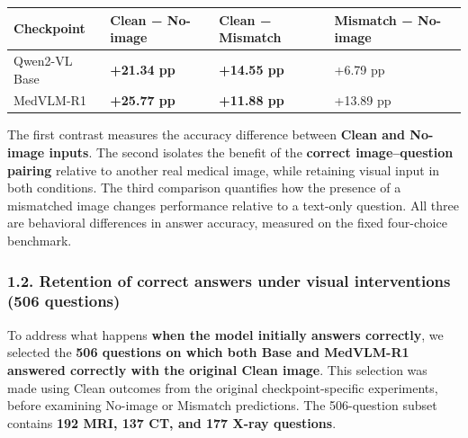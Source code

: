 \documentclass[
  10pt,
  a4paper,
]{article}
\newcounter{none} %
\begin{document}
{\def\LTcaptype{none} %
\begin{longtable}[]{@{}
  >{\raggedright\arraybackslash}p{}
  >{\raggedleft\arraybackslash}p{}
  >{\raggedleft\arraybackslash}p{}
  >{\raggedleft\arraybackslash}p{}@{}}
\toprule\noalign{}
\begin{minipage}[b]{\linewidth}\raggedright
Checkpoint
\end{minipage} & \begin{minipage}[b]{\linewidth}\raggedleft
Clean − No-image
\end{minipage} & \begin{minipage}[b]{\linewidth}\raggedleft
Clean − Mismatch
\end{minipage} & \begin{minipage}[b]{\linewidth}\raggedleft
Mismatch − No-image
\end{minipage} \\
\midrule\noalign{}
\endhead
\bottomrule\noalign{}
\endlastfoot
Qwen2-VL Base & \textbf{+21.34 pp} & \textbf{+14.55 pp} & +6.79 pp \\
MedVLM-R1 & \textbf{+25.77 pp} & \textbf{+11.88 pp} & +13.89 pp \\
\end{longtable}
}

The first contrast measures the accuracy difference between
\textbf{Clean and No-image inputs}. The second isolates the benefit of
the \textbf{correct image--question pairing} relative to another real
medical image, while retaining visual input in both conditions. The
third comparison quantifies how the presence of a mismatched image
changes performance relative to a text-only question. All three are
behavioral differences in answer accuracy, measured on the fixed
four-choice benchmark.

\subsubsection{1.2. Retention of correct answers under visual
interventions (506
questions)}\label{retention-of-correct-answers-under-visual-interventions-506-questions}

To address what happens \textbf{when the model initially answers
correctly}, we selected the \textbf{506 questions on which both Base and
MedVLM-R1 answered correctly with the original Clean image}. This
selection was made using Clean outcomes from the original
checkpoint-specific experiments, before examining No-image or Mismatch
predictions. The 506-question subset contains \textbf{192 MRI, 137 CT,
and 177 X-ray questions}.
\end{document}
